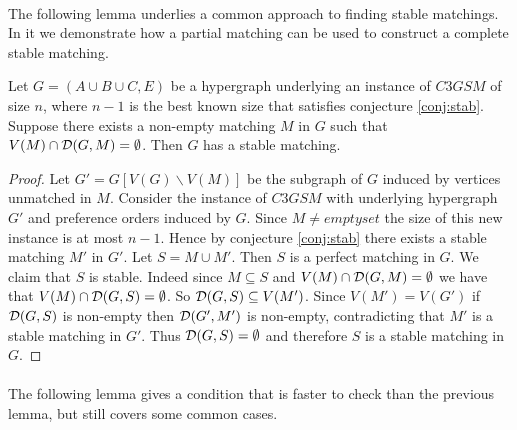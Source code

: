 \paragraph{}
The following lemma underlies a common approach to finding stable matchings. In it we demonstrate how a partial matching can be used to construct a complete stable matching.
\begin{lemma}\label{lemma:inductive}
Let $G=(A\cup B \cup C, E)$ be a hypergraph underlying an instance of $C3GSM$ of size $n$, where $n-1$ is the best known size that satisfies conjecture \ref{conj:stab}. Suppose there exists a non-empty matching $M$ in $G$ such that $V(M) \cap \mathcal{D}(G,M) = \emptyset$. Then $G$ has a stable matching.
\end{lemma}
\begin{proof}
Let $G' = G[V(G)\backslash V(M)]$ be the subgraph of $G$ induced by vertices unmatched in $M$.  Consider the instance of $C3GSM$ with underlying hypergraph $G'$ and preference orders induced by $G$. Since $M \neq emptyset$ the size of this new instance is at most $n-1$. Hence by conjecture \ref{conj:stab} there exists a stable matching $M'$ in $G'$. Let $S = M \cup M'$. Then $S$ is a perfect matching in $G$. We claim that $S$ is stable. Indeed since $M \subseteq S$ and $V(M) \cap \mathcal{D}(G,M) = \emptyset$ we have that $V(M) \cap \mathcal{D}(G,S) = \emptyset$. So $\mathcal{D}(G,S) \subseteq V(M')$. Since $V(M') = V(G')$ if $\mathcal{D}(G,S)$ is non-empty then $\mathcal{D}(G', M')$ is non-empty, contradicting that $M'$ is a stable matching in $G'$. Thus $\mathcal{D}(G,S) = \emptyset$ and therefore $S$ is a stable matching in $G$.
\end{proof}

\paragraph{}
The following lemma gives a condition that is faster to check than the previous lemma, but still covers some common cases.

